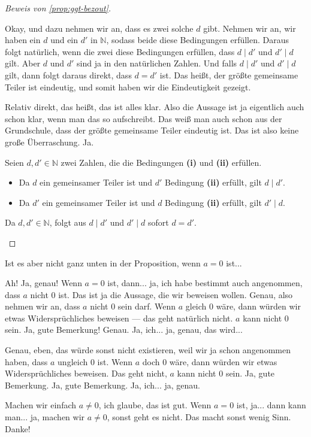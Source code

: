 \begin{proof}[Beweis von \cref{prop:ggt-bezout}]
\begin{spoken-clean}[00:23:34 - 00:25:45]
Okay, und dazu nehmen wir an, dass es zwei solche $d$ gibt. Nehmen wir an, wir haben ein $d$ und ein $d'$ in $\mathbb{N}$, sodass beide diese Bedingungen erfüllen. Daraus folgt natürlich, wenn die zwei diese Bedingungen erfüllen, dass $d \mid d'$ und $d' \mid d$ gilt. Aber $d$ und $d'$ sind ja in den natürlichen Zahlen. Und falls $d \mid d'$ und $d' \mid d$ gilt, dann folgt daraus direkt, dass $d = d'$ ist. Das heißt, der größte gemeinsame Teiler ist eindeutig, und somit haben wir die Eindeutigkeit gezeigt.

Relativ direkt, das heißt, das ist alles klar. Also die Aussage ist ja eigentlich auch schon klar, wenn man das so aufschreibt.  Das weiß man auch schon aus der Grundschule, dass der größte gemeinsame Teiler eindeutig ist. Das ist also keine große Überraschung. Ja.
\end{spoken-clean}

\begin{math-stroke}
Seien $d, d' \in \mathbb{N}$ zwei Zahlen, die die Bedingungen \textbf{(i)} und \textbf{(ii)} erfüllen.
\begin{itemize}
    \item Da $d$ ein gemeinsamer Teiler ist und $d'$ Bedingung \textbf{(ii)} erfüllt, gilt $d \mid d'$.
    \item Da $d'$ ein gemeinsamer Teiler ist und $d$ Bedingung \textbf{(ii)} erfüllt, gilt $d' \mid d$.
\end{itemize}
Da $d, d' \in \mathbb{N}$, folgt aus $d \mid d'$ und $d' \mid d$ sofort $d = d'$.
\end{math-stroke}
\end{proof}

\begin{student-interaction}
Ist es aber nicht ganz unten in der Proposition, wenn $a=0$ ist...
\end{student-interaction}

\begin{spoken-clean}[00:25:45 - 00:26:09]
Ah! Ja, genau! Wenn $a=0$ ist, dann... ja, ich habe bestimmt auch angenommen, dass $a$ nicht $0$ ist. Das ist ja die Aussage, die wir beweisen wollen. Genau, also nehmen wir an, dass $a$ nicht $0$ sein darf. Wenn $a$ gleich $0$ wäre, dann würden wir etwas Widersprüchliches beweisen --- das geht natürlich nicht. $a$ kann nicht $0$ sein. Ja, gute Bemerkung! Genau. Ja, ich... ja, genau, das wird... 

Genau, eben, das würde sonst nicht existieren, weil wir ja schon angenommen haben, dass $a$ ungleich $0$ ist. Wenn $a$ doch $0$ wäre, dann würden wir etwas Widersprüchliches beweisen. Das geht nicht, $a$ kann nicht $0$ sein. Ja, gute Bemerkung. Ja, gute Bemerkung. Ja, ich... ja, genau.

Machen wir einfach $a \neq 0$, ich glaube, das ist gut. Wenn $a = 0$ ist, ja... dann kann man... ja, machen wir $a \neq 0$, sonst geht es nicht. Das macht sonst wenig Sinn. Danke!
\end{spoken-clean}

